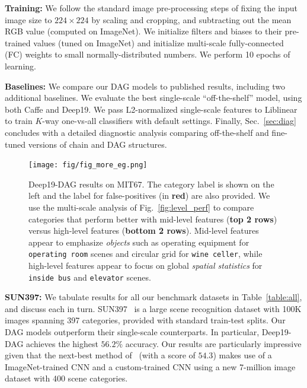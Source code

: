\documentclass[10pt,twocolumn,letterpaper]{article}
\newcommand{\songfan}[1]{\textcolor{blue}{[Songfan: #1]}}
\begin{document}
{\bf Training:}  We follow the standard image pre-processing steps of fixing the input image size to $224\times 224$ by scaling and cropping, and subtracting out the mean RGB value (computed on ImageNet). We initialize filters and biases to their pre-trained values (tuned on ImageNet) and initialize multi-scale fully-connected (FC) weights to small normally-distributed numbers. We perform 10 epochs of learning.

{\bf Baselines:} We compare our DAG models to published results, including two additional baselines. We evaluate the best single-scale ``off-the-shelf'' model, using both Caffe and Deep19. We pass L2-normalized single-scale features to Liblinear~\cite{liblinear} to train $K$-way one-vs-all classifiers with default settings. Finally, Sec.~\ref{sec:diag} concludes with a detailed diagnostic analysis comparing off-the-shelf and fine-tuned versions of chain and DAG structures.



\begin{figure}[t!]
\centering
	\texttt{[image: fig/fig\_more\_eg.png]}
\caption{Deep19-DAG results on MIT67. The category label is shown on the left and the label for false-positives (in {\bf red}) are also provided. We use the multi-scale analysis of Fig.~\ref{fig:level_perf} to compare categories that perform better with mid-level features ({\bf top 2 rows}) versus high-level features ({\bf bottom 2 rows}). Mid-level features appear to emphasize \textit{objects} such as operating equipment for {\tt operating room} scenes and circular grid for {\tt  wine celler}, while high-level features appear to focus on global \textit{spatial statistics} for {\tt inside bus} and {\tt elevator} scenes. }%
\label{fig:more_eg}
\end{figure}

{\bf SUN397:} We tabulate results for all our benchmark datasets in Table~\ref{table:all}, and discuss each in turn. SUN397~\cite{SUN397} is a large scene recognition dataset with 100K images spanning 397 categories, provided with standard train-test splits. Our DAG models outperform their single-scale counterparts. In particular, Deep19-DAG achieves the highest $56.2\%$ accuracy. Our results are particularly impressive given that the next-best method of~\cite{zhoulearning} (with a score of $54.3$) makes use of a ImageNet-trained CNN and a custom-trained CNN using a new 7-million image dataset with 400 scene categories.
\end{document}
